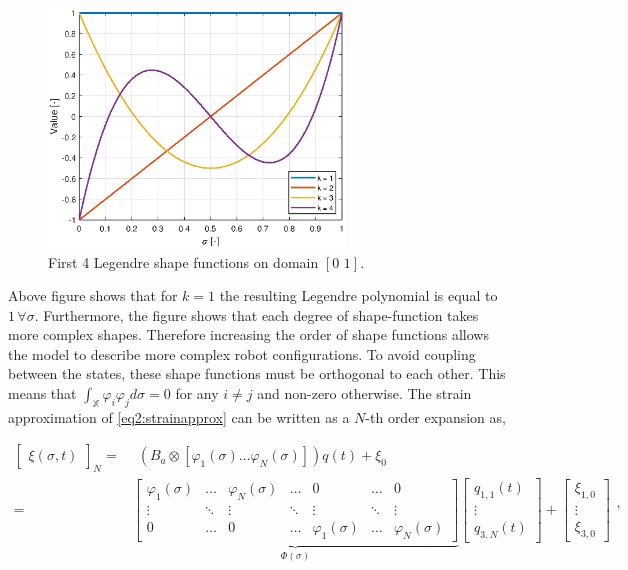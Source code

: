 \begin{figure}[H]
    \centering
    \includegraphics[width = 0.7\textwidth ]{Figures/Chapter2/shapefunction.eps}
    \caption{First 4 Legendre shape functions on domain $[0 \hspace{4pt} 1]$.}
    \label{fig2:shapefunction}
\end{figure}

Above figure shows that for $k=1$ the resulting Legendre polynomial is equal to $1 \hspace{2pt} \forall \sigma$. Furthermore, the figure shows that each degree of shape-function takes more complex shapes. Therefore increasing the order of shape functions allows the model to describe more complex robot configurations. To avoid coupling between the states, these shape functions must be orthogonal to each other. This means that $\int_\mathbb{X} \varphi_i \varphi_j d \sigma = 0$ for any $i \neq j$ and non-zero otherwise. The strain approximation of \ref{eq2:strainapprox} can be written as a $N$-th order expansion as,



\begin{equation}
\begin{aligned}
    \begin{bmatrix}\xi(\sigma,t)\end{bmatrix}_N = & \hspace{5pt}  (B_a \otimes [ \varphi_1(\sigma) \dots \varphi_N(\sigma) ])q(t) + \xi_0 \\ = &  \underbrace{ \begin{bmatrix}
    \varphi_1(\sigma) & \dots  & \varphi_N(\sigma) & \dots     & 0      & \dots  &  0 \\
    \vdots    & \ddots & \vdots    & \ddots    & \vdots & \ddots & \vdots \\
    0         & \dots  & 0         & \dots     & \varphi_1(\sigma) & \dots & \varphi_N (\sigma)
    \end{bmatrix}}_{\Phi(\sigma)} \begin{bmatrix} q_{1,1}(t) \\ \vdots \\ q_{3,N}(t) \end{bmatrix} +  \begin{bmatrix} \xi_{1,0} \\ \vdots \\ \xi_{3,0}   \end{bmatrix}
    \end{aligned},
\label{eq2:xishape}
\end{equation}

